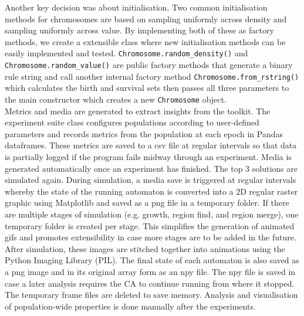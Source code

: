 Another key decision was about initialisation. Two common initialisation methods for chromosomes are based on sampling uniformly across density and sampling uniformly across value. By implementing both of these as factory methods, we create a extensible class where new initialisation methods can be easily implemented and tested. \texttt{Chromosome.random\_density()} and \texttt{Chromosome.random\_value()} are public factory methods that generate a binary rule string and call another internal factory method \texttt{Chromosome.from\_rstring()} which calculates the birth and survival sets then passes all three parameters to the main constructor which creates a new \texttt{Chromosome} object.\\

Metrics and media are generated to extract insights from the toolkit. The experiment suite class configures populations according to user-defined parameters and records metrics from the population at each epoch in Pandas dataframes. These metrics are saved to a csv file at regular intervals so that data is partially logged if the program fails midway through an experiment. Media is generated automatically once an experiment has finished. The top 3 solutions are simulated again. During simulation, a media save is triggered at regular intervals whereby the state of the running automaton is converted into a 2D regular raster graphic using Matplotlib and saved as a png file in a temporary folder. If there are multiple stages of simulation (e.g. growth, region find, and region merge), one temporary folder is created per stage. This simplifies the generation of animated gifs and promotes extensibility in case more stages are to be added in the future. After simulation, these images are stitched together into animations using the Python Imaging Library (PIL). The final state of each automaton is also saved as a png image and in its original array form as an npy file. The npy file is saved in case a later analysis requires the CA to continue running from where it stopped. The temporary frame files are deleted to save memory. Analysis and visualisation of population-wide properties is done manually after the experiments.

